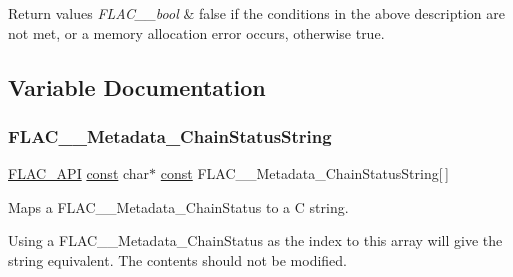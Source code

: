 \begin{DoxyRetVals}{Return values}
{\em F\+L\+A\+C\+\_\+\+\_\+bool} & {\ttfamily false} if the conditions in the above description are not met, or a memory allocation error occurs, otherwise {\ttfamily true}. \\
\hline
\end{DoxyRetVals}


\subsection{Variable Documentation}
\mbox{\label{group__flac__metadata__level2_gabb4646b4af36d17497676759767f8cc7}} 
\subsubsection{\texorpdfstring{F\+L\+A\+C\+\_\+\+\_\+\+Metadata\+\_\+\+Chain\+Status\+String}{FLAC\_\_Metadata\_ChainStatusString}}
{\footnotesize\ttfamily \hyperlink{group__flac__export_ga56ca07df8a23310707732b1c0007d6f5}{F\+L\+A\+C\+\_\+\+A\+PI} \hyperlink{zconf_8h_a2c212835823e3c54a8ab6d95c652660e}{const} char$\ast$ \hyperlink{zconf_8h_a2c212835823e3c54a8ab6d95c652660e}{const} F\+L\+A\+C\+\_\+\+\_\+\+Metadata\+\_\+\+Chain\+Status\+String\mbox{[}$\,$\mbox{]}}

Maps a F\+L\+A\+C\+\_\+\+\_\+\+Metadata\+\_\+\+Chain\+Status to a C string.

Using a F\+L\+A\+C\+\_\+\+\_\+\+Metadata\+\_\+\+Chain\+Status as the index to this array will give the string equivalent. The contents should not be modified. 